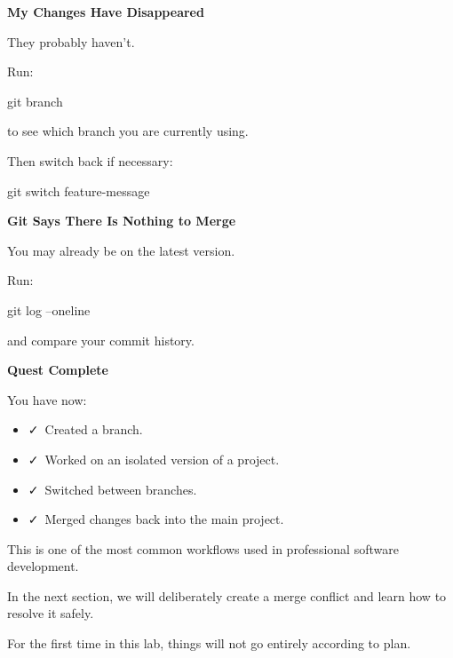 \documentclass{csc2059practical}
\begin{document}
\begin{commonerror}
\textbf{My Changes Have Disappeared}\par
\medskip

They probably haven't.


Run:


\end{commonerror}
\begin{terminalplain}
git branch
\end{terminalplain}
to see which branch you are currently using.

Then switch back if necessary:

\begin{terminalplain}
git switch feature-message
\end{terminalplain}
\begin{commonerror}
\textbf{Git Says There Is Nothing to Merge}\par
\medskip

You may already be on the latest version.


Run:


\end{commonerror}
\begin{terminalplain}
git log --oneline
\end{terminalplain}
and compare your commit history.

\begin{wrapupbox}
\textbf{Quest Complete}\par
\medskip

You have now:


\begin{itemize}
  \item \faCheck\ Created a branch.
\end{itemize}

\begin{itemize}
  \item \faCheck\ Worked on an isolated version of a project.
\end{itemize}

\begin{itemize}
  \item \faCheck\ Switched between branches.
\end{itemize}

\begin{itemize}
  \item \faCheck\ Merged changes back into the main project.
\end{itemize}

This is one of the most common workflows used in professional software development.


In the next section, we will deliberately create a merge conflict and learn how to resolve it safely.


For the first time in this lab, things will not go entirely according to plan.


\end{wrapupbox}
\end{document}

